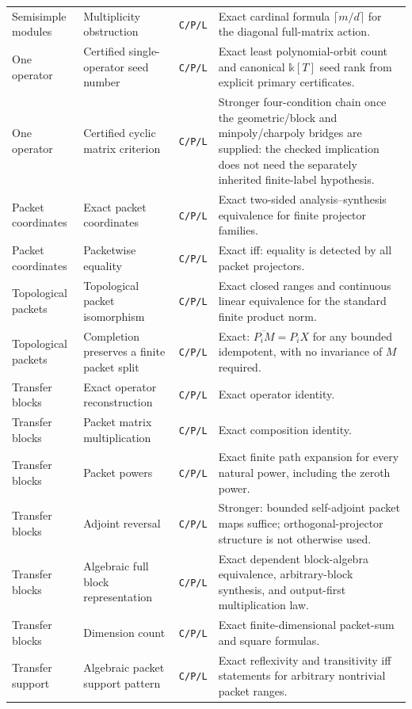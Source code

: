 \documentclass[11pt]{article}
\theoremstyle{definition}
\theoremstyle{remark}
\newcommand{\bbk}{\mathbb{k}}
\newcommand{\closure}[1]{\overline{#1}}
\begin{document}
\begin{longtable}{L{0.16\textwidth}L{0.25\textwidth}L{0.10\textwidth}L{0.38\textwidth}}
Semisimple modules & Multiplicity obstruction & \texttt{C/P/L} & Exact cardinal formula $\lceil m/d\rceil$ for the diagonal full-matrix action. \\
One operator & Certified single-operator seed number & \texttt{C/P/L} & Exact least polynomial-orbit count and canonical $\bbk[T]$ seed rank from explicit primary certificates. \\
One operator & Certified cyclic matrix criterion & \texttt{C/P/L} & Stronger four-condition chain once the geometric/block and minpoly/charpoly bridges are supplied: the checked implication does not need the separately inherited finite-label hypothesis. \\
Packet coordinates & Exact packet coordinates & \texttt{C/P/L} & Exact two-sided analysis--synthesis equivalence for finite projector families. \\
Packet coordinates & Packetwise equality & \texttt{C/P/L} & Exact iff: equality is detected by all packet projectors. \\
Topological packets & Topological packet isomorphism & \texttt{C/P/L} & Exact closed ranges and continuous linear equivalence for the standard finite product norm. \\
Topological packets & Completion preserves a finite packet split & \texttt{C/P/L} & Exact: $\closure{P_iM}=P_iX$ for any bounded idempotent, with no invariance of $M$ required. \\
Transfer blocks & Exact operator reconstruction & \texttt{C/P/L} & Exact operator identity. \\
Transfer blocks & Packet matrix multiplication & \texttt{C/P/L} & Exact composition identity. \\
Transfer blocks & Packet powers & \texttt{C/P/L} & Exact finite path expansion for every natural power, including the zeroth power. \\
Transfer blocks & Adjoint reversal & \texttt{C/P/L} & Stronger: bounded self-adjoint packet maps suffice; orthogonal-projector structure is not otherwise used. \\
Transfer blocks & Algebraic full block representation & \texttt{C/P/L} & Exact dependent block-algebra equivalence, arbitrary-block synthesis, and output-first multiplication law. \\
Transfer blocks & Dimension count & \texttt{C/P/L} & Exact finite-dimensional packet-sum and square formulas. \\
Transfer support & Algebraic packet support pattern & \texttt{C/P/L} & Exact reflexivity and transitivity iff statements for arbitrary nontrivial packet ranges. \\

\end{longtable}
\end{document}
